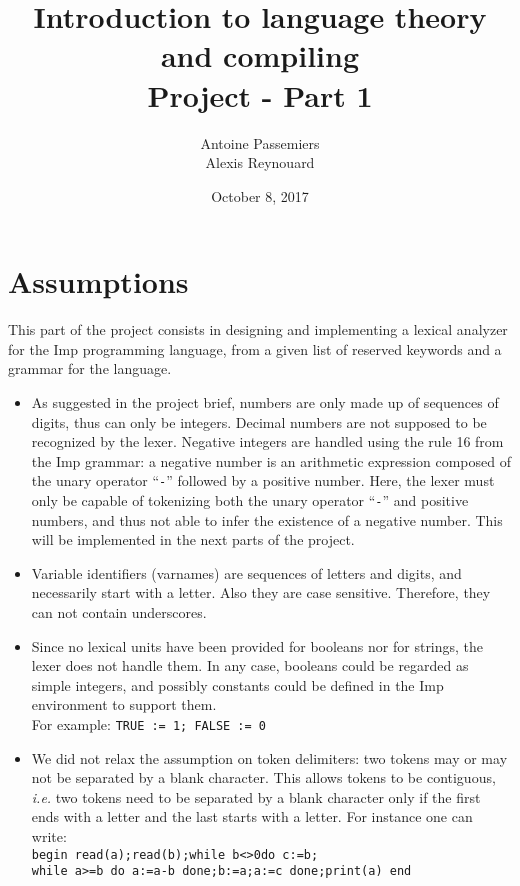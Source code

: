 \documentclass[12pt]{report}
\title{Introduction to language theory and compiling \\ Project - Part 1}
\author{Antoine Passemiers \\ Alexis Reynouard}
\date{October 8, 2017}
\begin{document}
\maketitle
\setcounter{tocdepth}{3}
\setcounter{secnumdepth}{3}
\setcounter{chapter}{0}
\tableofcontents
\pagebreak
\clearpage
\setcounter{page}{1}

\chapter{Assumptions}

This part of the project consists in designing and implementing a lexical analyzer for the Imp programming language,
from a given list of reserved keywords and a grammar for the language.

\begin{itemize}
  \item As suggested in the project brief, numbers are only made up of sequences of digits, thus can only
    be integers. Decimal numbers are not supposed to be recognized by the lexer. Negative integers are handled using
    the rule 16 from the Imp grammar: a negative number is an arithmetic expression composed of the unary operator
    ``\texttt{-}'' followed by a positive number. Here, the lexer must only be capable of tokenizing both the unary
    operator ``\texttt{-}'' and positive numbers, and thus not able to infer the existence of a negative number. This
    will be implemented in the next parts of the project.
  \item Variable identifiers (varnames) are sequences of letters and digits, and necessarily start with a letter. Also they are
    case sensitive. Therefore, they can not contain underscores.
  \item Since no lexical units have been provided for
    booleans nor for strings, the lexer does not handle them. In any case, booleans could be regarded as simple
    integers, and possibly constants could be defined in the Imp environment to support them. \\ For example:
    \texttt{TRUE := 1; FALSE := 0}
  \item We did not relax the assumption on token delimiters: two tokens may or may not be
    separated by a blank character. This allows tokens to be contiguous, \textit{i.e.} two tokens need to be separated
    by a blank character only if the first ends with a letter and the last starts with a letter.
    For instance one can write:\\
    \texttt{begin read(a);read(b);while b<>0do c:=b;\\while a>=b do a:=a-b done;b:=a;a:=c done;print(a) end}


\end{itemize}
\end{document}
